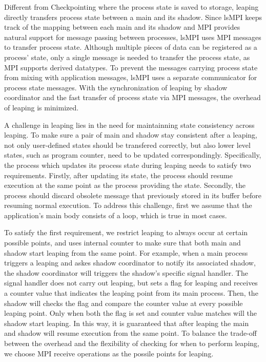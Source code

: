 Different from Checkpointing where the process state is saved to storage, leaping directly transfers process state between a main and its shadow. 
Since lsMPI keeps track of the mapping between each main and its shadow and MPI provides natural support for message passing between processes, 
lsMPI uses MPI messages to transfer process state. Although multiple pieces of data can be registered as a process' state, only a single message is needed to transfer the process state, as MPI supports derived datatypes. To prevent the messages carrying process state from mixing with application messages, lsMPI uses a separate communicator for process state messages. With the synchronization of leaping by shadow coordinator and the fast transfer of process state via MPI messages, the overhead of leaping is minimized. 

A challenge in leaping lies in the need for maintainning state consistency across leaping. To make sure a pair of main and shadow stay consistent after a leaping, not only user-defined states should be transfered correctly, but also lower level states, such as program counter, need to be updated correspondingly. Specifically, the process which updates its process state during leaping needs to satisfy two requirements. Firstly, after updating its state, the process should resume execution at the same point as the process providing the state. Secondly, the process should discard obsolete message that previously stored in its buffer before resuming normal execution. To address this challenge, first we assume that the application's main body consists of a loop, which is true in most cases. 

To satisfy the first requirement, we restrict leaping to always occur at certain possible points, and uses internal counter to make sure that both main and shadow start leaping from the same point. For example, when a main process triggers a leaping and askes shadow coordinator to notify its associated shadow, the shadow coordinator will triggers the shadow's specific signal handler. The signal handler does not carry out leaping, but sets a flag for leaping and receives a counter value that indicates the leaping point from its main process. Then, the shadow will checks the flag and compare the counter value at every possible leaping point. Only when both the flag is set and counter value matches will the shadow start leaping. In this way, it is guaranteed that after leaping the main and shadow will resume execution from the same point. To balance the trade-off between the overhead and the flexibility of checking for when to perform leaping, we choose MPI receive operations as the possile points for leaping. 

